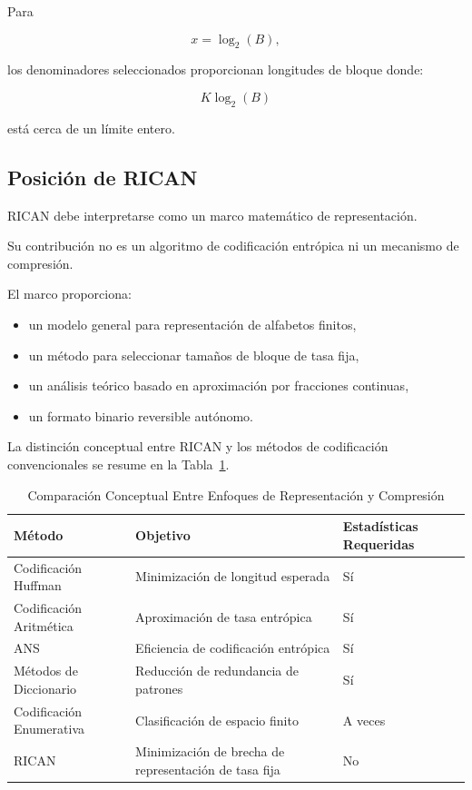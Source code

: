 \documentclass[onecolumn]{IEEEtran}
\begin{document}
Para

\[
x=\log_2(B),
\]

los denominadores seleccionados proporcionan longitudes de bloque
donde:

\[
K\log_2(B)
\]

está cerca de un límite entero.

\subsection{Posición de RICAN}

RICAN debe interpretarse como un marco matemático de representación.

Su contribución no es un algoritmo de codificación entrópica ni un
mecanismo de compresión.

El marco proporciona:

\begin{itemize}

\item un modelo general para representación de alfabetos finitos,

\item un método para seleccionar tamaños de bloque de tasa fija,

\item un análisis teórico basado en aproximación por fracciones
continuas,

\item un formato binario reversible autónomo.

\end{itemize}

La distinción conceptual entre RICAN y los métodos de codificación
convencionales se resume en la Tabla~\ref{tab:comparison}.

\begin{table}[!t]
\caption{Comparación Conceptual Entre Enfoques de Representación y
Compresión}
\label{tab:comparison}
\centering
\begin{tabular}{lll}
\toprule
Método & Objetivo & Estadísticas Requeridas\\
\midrule
Codificación Huffman &
Minimización de longitud esperada &
Sí\\

Codificación Aritmética &
Aproximación de tasa entrópica &
Sí\\

ANS &
Eficiencia de codificación entrópica &
Sí\\

Métodos de Diccionario &
Reducción de redundancia de patrones &
Sí\\

Codificación Enumerativa &
Clasificación de espacio finito &
A veces\\

RICAN &
Minimización de brecha de representación de tasa fija &
No\\

\bottomrule
\end{tabular}
\end{table}
\end{document}
